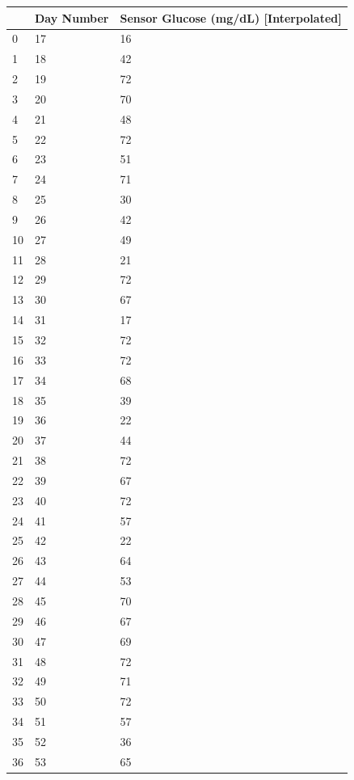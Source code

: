 \bigskip\noindent
\begin{tabular}{p{}p{}p{}}
\toprule
 & Day Number & Sensor Glucose (mg/dL) [Interpolated] \\
\hline
0 & 17 & 16 \\
\hline
1 & 18 & 42 \\
\hline
2 & 19 & 72 \\
\hline
3 & 20 & 70 \\
\hline
4 & 21 & 48 \\
\hline
5 & 22 & 72 \\
\hline
6 & 23 & 51 \\
\hline
7 & 24 & 71 \\
\hline
8 & 25 & 30 \\
\hline
9 & 26 & 42 \\
\hline
10 & 27 & 49 \\
\hline
11 & 28 & 21 \\
\hline
12 & 29 & 72 \\
\hline
13 & 30 & 67 \\
\hline
14 & 31 & 17 \\
\hline
15 & 32 & 72 \\
\hline
16 & 33 & 72 \\
\hline
17 & 34 & 68 \\
\hline
18 & 35 & 39 \\
\hline
19 & 36 & 22 \\
\hline
20 & 37 & 44 \\
\hline
21 & 38 & 72 \\
\hline
22 & 39 & 67 \\
\hline
23 & 40 & 72 \\
\hline
24 & 41 & 57 \\
\hline
25 & 42 & 22 \\
\hline
26 & 43 & 64 \\
\hline
27 & 44 & 53 \\
\hline
28 & 45 & 70 \\
\hline
29 & 46 & 67 \\
\hline
30 & 47 & 69 \\
\hline
31 & 48 & 72 \\
\hline
32 & 49 & 71 \\
\hline
33 & 50 & 72 \\
\hline
34 & 51 & 57 \\
\hline
35 & 52 & 36 \\
\hline
36 & 53 & 65 \\

\end{tabular}
